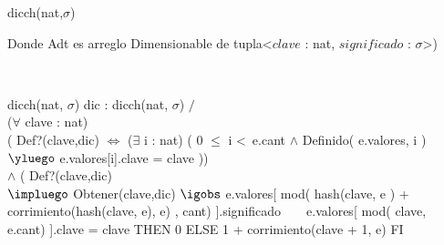 \begin{Representacion}

	
	\begin{Estructura}{dicch(nat,$\sigma$)}
		\begin{Tupla}
		\end{Tupla}
		Donde Adt es arreglo Dimensionable de tupla<$clave$ : nat, $significado$ : $\sigma$>)
	\end{Estructura}
	
	
~
	
	\AbsFc
	{dicch(nat, $\sigma$)}
	{dic : dicch(nat, $\sigma$) $/$ \\
		($\forall$ clave : nat) \\
		( Def?(clave,dic) $\Leftrightarrow$ ($\exists$ i : nat)
		( 0 $\leq$ i <\ e.cant $\land$ Definido( e.valores, i ) 
		$\yluego$ e.valores[i].clave = clave )) 
		\\	$\land$ ( Def?(clave,dic) 	\\
		$\impluego$ Obtener(clave,dic) $\igobs$ 
		e.valores[ mod( hash(clave, e ) + corrimiento(hash(clave, e), e) , cant) ].significado}
~
~											
	{\IF e.valores[ mod( clave, e.cant) ].clave = clave
		THEN 0
		ELSE 1 + corrimiento(clave + 1, e)
	FI}		

\end{Representacion}

